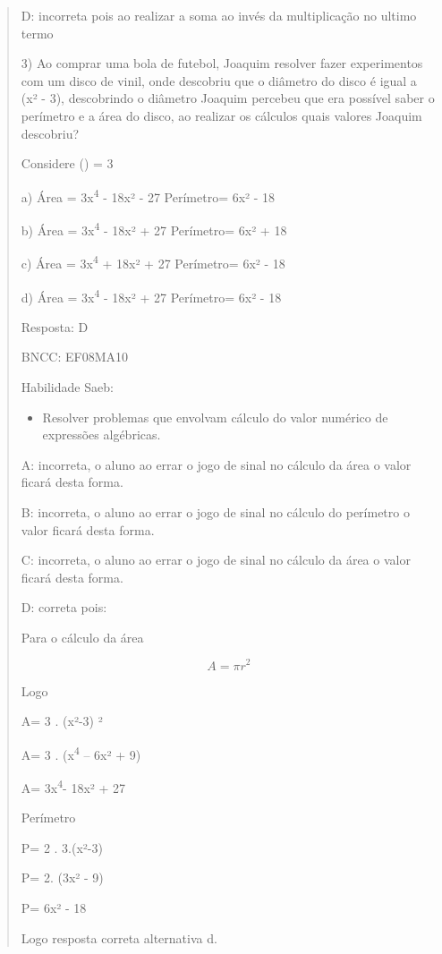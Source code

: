 \begin{quote}
\begin{escolha}
D: incorreta pois ao realizar a soma ao invés da multiplicação no ultimo
termo

3) Ao comprar uma bola de futebol, Joaquim resolver fazer experimentos
com um disco de vinil, onde descobriu que o diâmetro do disco é igual a
(x² - 3), descobrindo o diâmetro Joaquim percebeu que era possível saber
o perímetro e a área do disco, ao realizar os cálculos quais valores
Joaquim descobriu?

Considere (\pi) = 3

a) Área = 3x\textsuperscript{4} - 18x² - 27 Perímetro= 6x² - 18

b) Área = 3x\textsuperscript{4} - 18x² + 27 Perímetro= 6x² + 18

c) Área = 3x\textsuperscript{4} + 18x² + 27 Perímetro= 6x² - 18

d) Área = 3x\textsuperscript{4} - 18x² + 27 Perímetro= 6x² - 18

Resposta: D

BNCC: EF08MA10

Habilidade Saeb:

\begin{itemize}
\tightlist
\item
  Resolver problemas que envolvam cálculo do valor numérico de
  expressões algébricas.
\end{itemize}

A: incorreta, o aluno ao errar o jogo de sinal no cálculo da área o
valor ficará desta forma.

B: incorreta, o aluno ao errar o jogo de sinal no cálculo do perímetro o
valor ficará desta forma.

C: incorreta, o aluno ao errar o jogo de sinal no cálculo da área o
valor ficará desta forma.

D: correta pois:

Para o cálculo da área

\[A = \pi r^{2}\]

Logo

A= 3 . (x²-3) ²

A= 3 . (x\textsuperscript{4} -- 6x² + 9)

A= 3x\textsuperscript{4}- 18x² + 27

Perímetro


P= 2 . 3.(x²-3)

P= 2. (3x² - 9)

P= 6x² - 18

Logo resposta correta alternativa d.


\end{escolha}
\end{quote}
